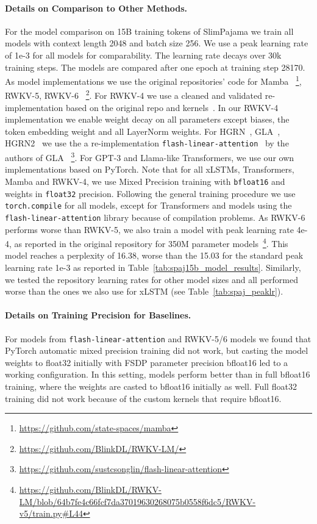 \documentclass[dvipsnames]{article}
\begin{document}
\begin{appendix}
\paragraph{Details on Comparison to Other Methods.}
\label{sec:appExpComparison}
For the model comparison on 15B training tokens of SlimPajama we train all models with context length 2048 and batch size 256.
We use a peak learning rate of 1e-3 for all models for comparability.
The learning rate decays over 30k training steps.
The models are compared after one epoch at training step 28170.
As model implementations we use the original repositories' code for Mamba~\citep{Gu:24arxiv} \footnote{\url{https://github.com/state-spaces/mamba}}, RWKV-5, RWKV-6~\citep{Peng:24arxivshort} \footnote{\url{https://github.com/BlinkDL/RWKV-LM/}}.
For RWKV-4 we use a cleaned and validated re-implementation based on the original repo and kernels~\citep{Peng:23arxivshort}.
In our RWKV-4 implementation we enable weight decay on all parameters except biases, the token embedding weight and all LayerNorm weights.
For HGRN~\citep{Qin:23}, GLA~\citep{Yang:23arxiv}, HGRN2~\citep{Qin:24arxiv} we use the a re-implementation \texttt{flash-linear-attention}~\citep{Yang:24} by the authors of GLA~\citep{Yang:23arxiv,Yang:24} \footnote{\url{https://github.com/sustcsonglin/flash-linear-attention}}.
For GPT-3 and Llama-like Transformers, we use our own implementations based on PyTorch. Note that for all xLSTMs, Transformers, Mamba and RWKV-4, we use Mixed Precision training with \texttt{bfloat16} and weights in \texttt{float32} precision.
Following the general training procedure we use \texttt{torch.compile} for all models, except for Transformers and models using the \texttt{flash-linear-attention} library because of compilation problems.
As RWKV-6 performs worse than RWKV-5, we also train a model with peak learning rate 4e-4, as reported in the original repository for 350M parameter models~\footnote{\url{https://github.com/BlinkDL/RWKV-LM/blob/64b7fe4c66fcf7da37019630268075b0558f6dc5/RWKV-v5/train.py\#L44}}. This model reaches a perplexity of 16.38, worse than the 15.03 for the standard peak learning rate 1e-3 as reported in Table~\ref{tab:spaj15b_model_results}. Similarly, we tested the repository learning rates for other model sizes and all performed worse than the ones we also use for xLSTM (see Table~\ref{tab:spaj_peaklr}).
\paragraph{Details on Training Precision for Baselines.}
For models from \texttt{flash-linear-attention} and
RWKV-5/6 models we found that PyTorch automatic mixed precision training did not work, but
casting the model weights to float32 initially with FSDP parameter precision bfloat16 led to a
working configuration. In this setting, models perform better than in full bfloat16 training, where the weights are casted to bfloat16 initially as well. Full float32 training did not work because of the custom kernels that require bfloat16.

\end{appendix}
\end{document}
